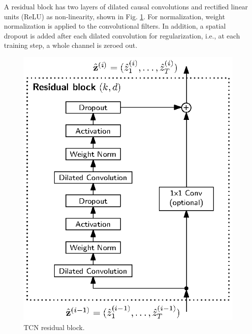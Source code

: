 \documentclass{scrartcl}
\begin{document}
A residual block has two layers of dilated causal convolutions and rectified linear units (ReLU) as non-linearity, shown in Fig. \ref{fig:residual_block}. For normalization, weight normalization \cite{Salimans2016} is applied to the convolutional filters. In addition, a spatial dropout \cite{Srivastava2014} is added after each dilated convolution for regularization, i.e., at each training step, a whole channel is zeroed out.
\begin{figure}[htbp]
\centering
\includegraphics[scale=1]{figures/residual_block.eps}
\caption{TCN residual block.}
\label{fig:residual_block} 
\end{figure}
\end{document}
